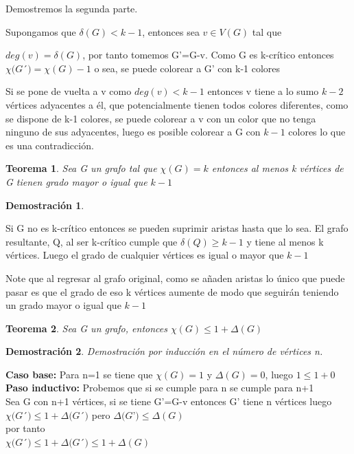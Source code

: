\documentclass[a4paper,1pt]{report}
\newtheorem*{teo}{Teorema}
\newtheorem*{dem}{Demostración}
\begin{document}
Demostremos la segunda parte.

Supongamos que  $\delta (G)< k-1$, entonces sea $v\in V(G)$ tal que 

$deg(v)=\delta (G)$, por tanto tomemos G'=G-v. Como G es k-crítico entonces $\chi(G$´$)=\chi(G)-1$ o sea, se puede colorear a G' con k-1 colores

Si se pone de vuelta a v como $deg(v)<k-1$ entonces v tiene a lo sumo $k-2$ vértices adyacentes a él, que potencialmente tienen todos colores diferentes, como se dispone de k-1 colores, se puede colorear a v con un color que no tenga ninguno de sus adyacentes, luego es posible colorear a G con $k-1$ colores lo que es una contradicción. 

\begin{teo}
 Sea G un grafo tal que $\chi(G)=k$ entonces al menos k vértices de G tienen grado mayor o igual que $k-1$
\end{teo}

\begin{dem}
 
\end{dem}

Si G no es k-crítico entonces se pueden suprimir aristas hasta que lo sea. El grafo resultante, Q, al ser k-crítico cumple que $\delta(Q)\geq k-1$ y tiene al menos k vértices. Luego el grado de cualquier vértices es igual o mayor que $k-1$

Note que al regresar al grafo original, como se añaden aristas lo único que puede pasar es que el grado de eso k vértices aumente de modo que seguirán teniendo un grado mayor o igual que $k-1$

\begin{teo}
 Sea G un grafo, entonces $\chi(G)\leq 1 + \Delta(G)$
\end{teo}

\begin{dem}
Demostración por inducción en el número de vértices n. 
\end{dem}

\textbf{Caso base:} Para n=1 se tiene que $\chi(G)=1$ y $\Delta(G)=0$, luego $1\leq1+0$\\

\textbf{Paso inductivo:} Probemos que si se cumple para n se cumple para n+1\\

Sea G con n+1 vértices, si se tiene G'=G-v entonces G' tiene n vértices luego
$\chi(G$´$)\leq 1 + \Delta(G$´$)$ pero $\Delta(G$'$)\leq \Delta(G)$\\ 
por tanto\\
$\chi(G$´$)\leq 1 + \Delta(G$´$)\leq 1 + \Delta(G)$\\
\end{document}
